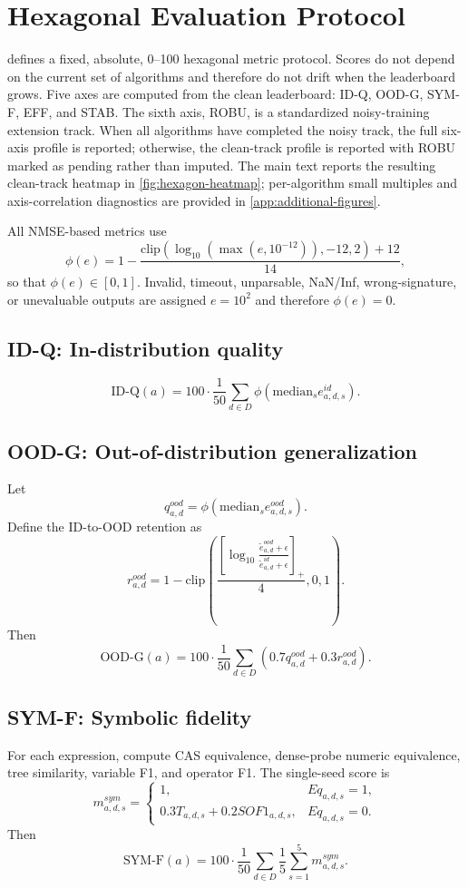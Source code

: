 \section{Hexagonal Evaluation Protocol}

\arena{} defines a fixed, absolute, 0--100 hexagonal metric protocol. Scores do not depend on the current set of algorithms and therefore do not drift when the leaderboard grows. Five axes are computed from the clean \core{} leaderboard: ID-Q, OOD-G, SYM-F, EFF, and STAB. The sixth axis, ROBU, is a standardized noisy-training extension track. When all algorithms have completed the noisy track, the full six-axis profile is reported; otherwise, the clean-track profile is reported with ROBU marked as pending rather than imputed.
The main text reports the resulting clean-track heatmap in \cref{fig:hexagon-heatmap}; per-algorithm small multiples and axis-correlation diagnostics are provided in \cref{app:additional-figures}.

All NMSE-based metrics use
\[
\phi(e)=1-\frac{\mathrm{clip}(\log_{10}(\max(e,10^{-12})),-12,2)+12}{14},
\]
so that $\phi(e)\in[0,1]$. Invalid, timeout, unparsable, NaN/Inf, wrong-signature, or unevaluable outputs are assigned $e=10^2$ and therefore $\phi(e)=0$.

\subsection{ID-Q: In-distribution quality}
\[
\mathrm{ID\text{-}Q}(a)=100\cdot\frac{1}{50}\sum_{d\in D}\phi\left(\mathrm{median}_s e^{id}_{a,d,s}\right).
\]

\subsection{OOD-G: Out-of-distribution generalization}
Let
\[
q^{ood}_{a,d}=\phi(\mathrm{median}_s e^{ood}_{a,d,s}).
\]
Define the ID-to-OOD retention as
\[
r^{ood}_{a,d}=1-\mathrm{clip}\left(\frac{\left[\log_{10}\frac{\tilde e^{ood}_{a,d}+\epsilon}{\tilde e^{id}_{a,d}+\epsilon}\right]_+}{4},0,1\right).
\]
Then
\[
\mathrm{OOD\text{-}G}(a)=100\cdot\frac{1}{50}\sum_{d\in D}(0.7q^{ood}_{a,d}+0.3r^{ood}_{a,d}).
\]

\subsection{SYM-F: Symbolic fidelity}
For each expression, compute CAS equivalence, dense-probe numeric equivalence, tree similarity, variable F1, and operator F1. The single-seed score is
\[
m^{sym}_{a,d,s}=\begin{cases}
1, & Eq_{a,d,s}=1,\\
0.3T_{a,d,s}+0.2SOF1_{a,d,s}, & Eq_{a,d,s}=0.
\end{cases}
\]
Then
\[
\mathrm{SYM\text{-}F}(a)=100\cdot\frac{1}{50}\sum_{d\in D}\frac{1}{5}\sum_{s=1}^{5}m^{sym}_{a,d,s}.
\]

